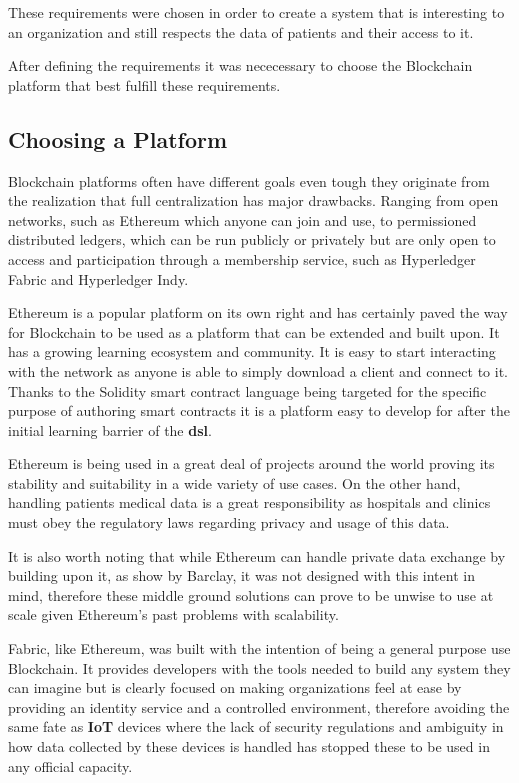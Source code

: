 These requirements were chosen in order to create a system that is interesting
to an organization and still respects the data of patients and their access to
it. 

After defining the requirements it was nececessary to choose the Blockchain
platform that best fulfill these requirements.


\subsection{Choosing a Platform}\label{choosePlatform}

Blockchain platforms often have different goals even tough they originate from
the realization that full centralization has major drawbacks. Ranging from open
networks, such as Ethereum which anyone can join and use, to permissioned
distributed ledgers, which can be run publicly or privately but are only open
to access and participation through a membership service, such as Hyperledger
Fabric and Hyperledger Indy.

Ethereum is a popular platform on its own right and has certainly paved the way
for Blockchain to be used as a platform that can be extended and built upon. It
has a growing learning ecosystem and community. It is easy to start interacting
with the network as anyone is able to simply download a client and connect to
it.  Thanks to the Solidity smart contract language being targeted for the
specific purpose of authoring smart contracts it is a platform easy to develop
for after the initial learning barrier of the \textbf{dsl}. 

Ethereum is being used in a great deal of projects around the world proving its
stability and suitability in a wide variety of use cases. On the other hand,
handling patients medical data is a great responsibility as hospitals and
clinics must obey the regulatory laws regarding privacy and usage of this data.

It is also worth noting that while Ethereum can handle private data exchange by
building upon it, as show by Barclay, it was not designed with this intent in
mind, therefore these middle ground solutions can prove to be unwise to use at
scale given Ethereum's past problems with scalability.

Fabric, like Ethereum, was built with the intention of being a general purpose
use Blockchain. It provides developers with the tools needed to build any
system they can imagine but is clearly focused on making organizations feel at
ease by providing an identity service and a controlled environment, therefore
avoiding the same fate as \textbf{IoT} devices where the lack of security
regulations and ambiguity in how data collected by these devices is handled has
stopped these to be used in any official capacity.

